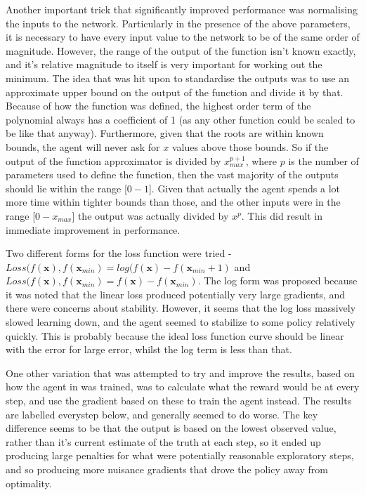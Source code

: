 Another important trick that significantly improved performance was normalising the inputs to the network. Particularly in the presence of the above parameters, it is necessary to have every input value to the network to be of the same order of magnitude. However, the range of the output of the function isn't known exactly, and it's relative magnitude to itself is very important for working out the minimum. The idea that was hit upon to standardise the outputs was to use an approximate upper bound on the output of the function and divide it by that. Because of how the function was defined, the highest order term of the polynomial always has a coefficient of 1 (as any other function could be scaled to be like that anyway). Furthermore, given that the roots are within known bounds, the agent will never ask for $x$ values above those bounds. So if the output of the function approximator is divided by $x_{max}^{p+1}$, where $p$ is the number of parameters used to define the function, then the vast majority of the outputs should lie within the range [$0 - 1$]. Given that actually the agent spends a lot more time within tighter bounds than those, and the other inputs were in the range [$0- x_{max} $] the output was actually divided by $x^p$. This did result in immediate improvement in performance.

Two different forms for the loss function were tried - $Loss(f(\boldsymbol{x}), f(\boldsymbol{x}_{min}) = log(f(\boldsymbol{x}) - f(\boldsymbol{x}_{min} +1)$ and $Loss(f(\boldsymbol{x}), f(\boldsymbol{x}_{min}) = f(\boldsymbol{x}) - f(\boldsymbol{x}_{min})$. The log form was proposed because it was noted that the linear loss produced potentially very large gradients, and there were concerns about stability. However, it seems that the log loss massively slowed learning down, and the agent seemed to stabilize to some policy relatively quickly. This is probably because the ideal loss function curve should be linear with the error for large error, whilst the log term is less than that.

One other variation that was attempted to try and improve the results, based on how the agent in \cite{RVA} was trained, was to calculate what the reward would be at every step, and use the gradient based on these to train the agent instead. The results are labelled everystep below, and generally seemed to do worse. The key difference seems to be that the output is based on the lowest observed value, rather than it's current estimate of the truth at each step, so it ended up producing large penalties for what were potentially reasonable exploratory steps, and so producing more nuisance gradients that drove the policy away from optimality.


